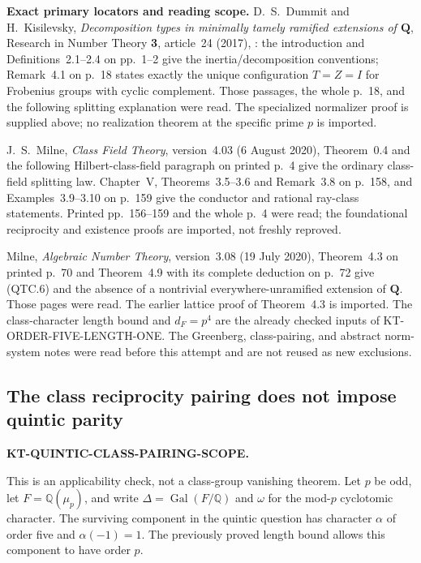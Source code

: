 \documentclass[11pt,a4paper]{article}
\theoremstyle{definition}
\renewcommand{\paragraph}[1]{\par\smallskip\noindent\textbf{#1}\quad\ignorespaces}
\begin{document}
\paragraph{Exact primary locators and reading scope.}
D.~S.~Dummit and H.~Kisilevsky,
\emph{Decomposition types in minimally tamely ramified extensions
of $\mathbf Q$}, Research in Number Theory \textbf{3}, article~24
(2017), :
the introduction and Definitions~2.1--2.4 on pp.~1--2 give the
inertia/decomposition conventions; Remark~4.1 on p.~18 states
exactly the unique configuration $T=Z=I$ for Frobenius groups with
cyclic complement.  Those passages, the whole p.~18, and the
following splitting explanation were read.  The specialized
normalizer proof is supplied above; no realization theorem at the
specific prime $p$ is imported.

J.~S.~Milne, \emph{Class Field Theory}, version~4.03
(6 August 2020), Theorem~0.4 and the following Hilbert-class-field
paragraph on printed p.~4 give the ordinary class-field splitting
law.  Chapter~V, Theorems~3.5--3.6 and Remark~3.8 on p.~158,
and Examples~3.9--3.10 on p.~159 give the conductor and rational
ray-class statements.  Printed pp.~156--159 and the whole p.~4
were read; the foundational reciprocity and existence proofs are
imported, not freshly reproved.

Milne, \emph{Algebraic Number Theory}, version~3.08
(19 July 2020), Theorem~4.3 on printed p.~70 and Theorem~4.9
with its complete deduction on p.~72 give (QTC.6) and the absence
of a nontrivial everywhere-unramified extension of $\mathbf Q$.
Those pages were read.  The earlier lattice proof of Theorem~4.3
is imported.  The class-character length bound and $d_F=p^4$
are the already checked inputs of KT-ORDER-FIVE-LENGTH-ONE.
The Greenberg, class-pairing, and abstract norm-system notes were
read before this attempt and are not reused as new exclusions.



\subsection{The class reciprocity pairing does not impose quintic parity}
\label{KT-QUINTIC-CLASS-PAIRING-SCOPE}
\noindent\textbf{KT-QUINTIC-CLASS-PAIRING-SCOPE.}\quad

This is an applicability check, not a class-group vanishing theorem.
Let $p$ be odd, let $F=\mathbb Q(\mu_p)$, and write
$\Delta=\operatorname{Gal}(F/\mathbb Q)$ and $\omega$ for the mod-$p$
cyclotomic character.  The surviving component in the quintic question has
character $\alpha$ of order five and $\alpha(-1)=1$.  The previously proved
length bound allows this component to have order $p$.
\end{document}
